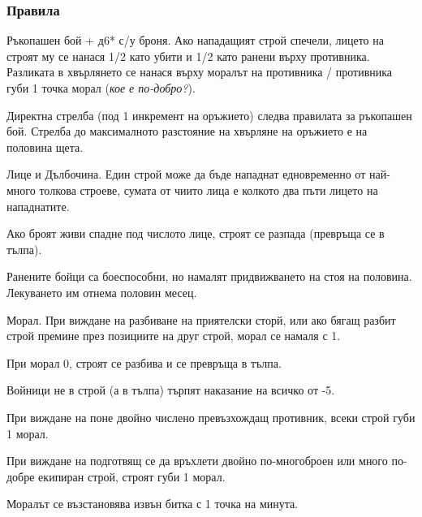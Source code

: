 \subsubsection{Правила}
Ръкопашен бой + д6* с/у броня. Ако нападащият строй спечели, лицето на строят му се нанася 1/2 като убити и 1/2 като ранени върху противника. Разликата в хвърлянето се нанася върху моралът на противника / противника губи 1 точка морал (\textit{кое е по-добро?}).

Директна стрелба (под 1 инкремент на оръжието) следва правилата за ръкопашен бой. Стрелба до максималното разстояние на хвърляне на оръжието е на половина щета.

Лице и Дълбочина. Един строй може да бъде нападнат едновременно от най-много толкова строеве, сумата от чиито лица е колкото два пъти лицето на  нападнатите.

Ако броят живи спадне под числото лице, строят се разпада (превръща се в тълпа).

Ранените бойци са боеспособни, но намалят придвижването на стоя на половина. Лекуването им отнема половин месец.

Морал. При виждане на разбиване на приятелски сторй, или ако бягащ разбит строй премине през позициите на друг строй, морал се намаля с 1.

При морал 0, строят се разбива и се превръща в тълпа.

Войници не в строй (а в тълпа) търпят наказание на всичко от -5.

При виждане на поне двойно числено превъзхождащ противник, всеки строй губи 1 морал.

При виждане на подготвящ се да връхлети двойно по-многоброен или много по-добре екипиран строй, строят губи 1 морал.

Моралът се възстановява извън битка с 1 точка на минута.














